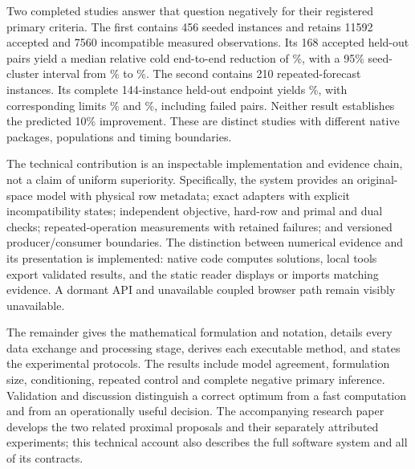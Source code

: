 Two completed studies answer that question negatively for their registered
primary criteria. The first contains 456 seeded instances and retains 11592
accepted and 7560 incompatible measured observations. Its 168 accepted held-out
pairs yield a median relative cold end-to-end reduction of \OriginalEstimate\%,
with a 95\% seed-cluster interval from \OriginalLower\% to \OriginalUpper\%.
The second contains 210 repeated-forecast instances. Its complete 144-instance
held-out endpoint yields \PrimaryEstimate\%, with corresponding limits
\PrimaryLower\% and \PrimaryUpper\%, including \PrimaryFailed{} failed pairs.
Neither result establishes the predicted 10\% improvement. These are distinct
studies with different native packages, populations and timing boundaries.

The technical contribution is an inspectable implementation and evidence chain,
not a claim of uniform superiority. Specifically, the system provides an original-
space model with physical row metadata; exact adapters with explicit incompatibility
states; independent objective, hard-row and primal and dual checks; repeated-operation
measurements with retained failures; and versioned producer/consumer boundaries.
The distinction between numerical evidence and its presentation is implemented:
native code computes solutions, local tools export validated results, and the
static reader displays or imports matching evidence. A dormant API and unavailable
coupled browser path remain visibly unavailable.

The remainder gives the mathematical formulation and notation, details every
data exchange and processing stage, derives each executable method, and states
the experimental protocols. The results include model agreement, formulation
size, conditioning, repeated control and complete negative primary inference.
Validation and discussion distinguish a correct optimum from a fast computation
and from an operationally useful decision. The accompanying research paper
develops the two related proximal proposals and their separately attributed
experiments; this technical account also describes the full software system and
all of its contracts.
